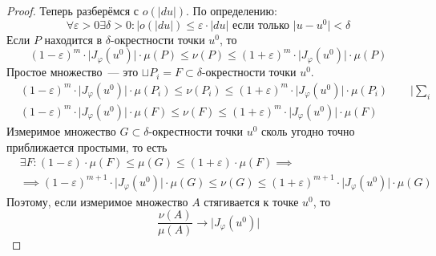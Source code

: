 \begin{proof}
    Теперь разберёмся с $o(|du|)$. По определению:
    \begin{equation*}
        \forall \varepsilon > 0 \exists \delta > 0 : \lvert o(\lvert du \rvert) \leq \varepsilon \cdot \lvert du \rvert \text{ если только } \lvert u - u^0 \rvert < \delta
    \end{equation*}
    Если $P$ находится в $\delta$-окрестности точки $u^0$, то
    \begin{equation*}
        (1 - \varepsilon)^m \cdot \lvert J_\varphi(u^0) \rvert \cdot \mu(P) \leq \nu(P) \leq (1 + \varepsilon)^m \cdot \lvert J_\varphi(u^0) \rvert \cdot \mu(P)
    \end{equation*}
    Простое множество~--- это $\sqcup P_i = F \subset \delta$-окрестности точки $u^0$.
    \begin{align*}
        &(1 - \varepsilon)^m \cdot \lvert J_\varphi(u^0) \rvert \cdot \mu(P_i) \leq \nu(P_i) \leq (1 + \varepsilon)^m \cdot \lvert J_\varphi(u^0) \rvert \cdot \mu(P_i) \hspace{2em} \Bigg| \sum_i\\[1em]
        &(1 - \varepsilon)^m \cdot \lvert J_\varphi(u^0) \rvert \cdot \mu(F) \leq \nu(F) \leq (1 + \varepsilon)^m \cdot \lvert J_\varphi(u^0) \rvert \cdot \mu(F)
    \end{align*}
    Измеримое множество $G \subset \delta$-окрестности точки $u^0$ сколь угодно точно приближается простыми, то есть
    \begin{align*}
        &\exists F: (1 - \varepsilon) \cdot \mu(F) \leq \mu(G) \leq (1 + \varepsilon) \cdot \mu(F) \implies\\
        &\implies (1 - \varepsilon)^{m + 1} \cdot \lvert J_\varphi(u^0) \rvert \cdot \mu(G) \leq \nu(G) \leq (1 + \varepsilon)^{m + 1} \cdot \lvert J_\varphi(u^0) \rvert \cdot \mu(G)
    \end{align*}
    Поэтому, если измеримое множество $A$ стягивается к точке $u^0$, то 
    \begin{equation*}
        \frac{\nu(A)}{\mu(A)} \to \lvert J_\varphi(u^0) \rvert
    \end{equation*}
\end{proof}